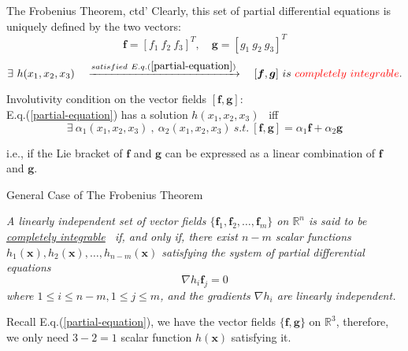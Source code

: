 \documentclass{beamer}
\renewcommand{\vec}[1]{\ensuremath{\boldsymbol{#1}}} %
\begin{document}
\begin{frame}{The Frobenius Theorem, ctd'}
    Clearly, this set of partial differential equations is uniquely defined by the two vectors:
    $$
    \vec{f}=[f_{1}~f_{2}~f_{3}]^{T},\quad \vec{g}=[g_{1}~g_{2}~g_{3}]^{T}
    $$
    \vspace{-10pt}
    $$
    \exists ~h(x_{1},x_{2},x_{3}) \quad \xrightarrow{satisfied~E.q.(\ref{partial-equation})} \quad [\vec{f}, \vec{g}] ~is ~{\color{red}completely ~integrable}.
    $$

    {\color{red} Involutivity condition} on the vector fields $[\vec{f}, \vec{g}]$:\\
    E.q.(\ref{partial-equation}) has a solution $h(x_{1},x_{2},x_{3})$ ~iff
    $$\exists ~\alpha_{1}(x_{1},x_{2},x_{3})~,~\alpha_{2}(x_{1},x_{2},x_{3}) ~s.t.~[\vec{f},\vec{g}] = \alpha_{1}\vec{f}+\alpha_{2}\vec{g}$$

    i.e., if the Lie bracket of \vec{f} and \vec{g} can be expressed as a {\color{red}linear combination} of \vec{f} and \vec{g}.
\end{frame}


\begin{frame}{General Case of The Frobenius Theorem}
\begin{definition}[6.4]
\textit{A linearly independent set of vector fields $ \{ \vec{f}_{1}, \vec{f}_{2}, \dots, \vec{f}_{m} \} $ on $\mathbb{R}^{n}$ is said to be \underline{completely integrable}~ if, and only if, there exist {\color{red}$ n-m $} scalar functions $h_{1}(\vec{x}), h_{2}(\vec{x}), \dots , h_{n-m}(\vec{x})$ satisfying the system of partial differential equations
    \begin{equation}\label{differential-equation}
      \nabla h_{i}\vec{f}_{j} = 0
    \end{equation}
    where $1 \leq i \leq n-m , 1 \leq j \leq m$, and the gradients $ \nabla h_{i} $ are linearly independent.}
\end{definition}

Recall E.q.(\ref{partial-equation}), we have the vector fields $\{ \vec{f}, \vec{g} \}$ on $\mathbb{R}^{3}$, therefore, we only need $3-2=1$ scalar function $h(\vec{x})$ satisfying it.
\end{frame}
\end{document}

